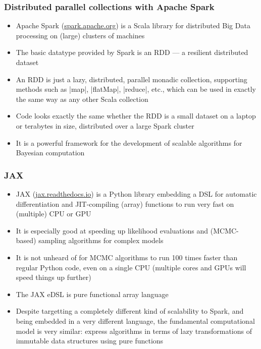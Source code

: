 \documentclass[mathserif,handout]{beamer}
\begin{document}
\begin{frame}[fragile]
  \frametitle{Distributed parallel collections with Apache Spark}
  \begin{itemize}
  \item \alert{Apache Spark} (\url{spark.apache.org}) is a Scala library for distributed Big Data processing on (large) clusters of machines
  \item The basic datatype provided by Spark is an \alert{RDD} --- a resilient distributed dataset
  \item An RDD is just a \alert{lazy}, \alert{distributed}, parallel monadic collection, supporting methods such as |map|, |flatMap|, |reduce|, etc., which can be used in exactly the same way as any other Scala collection
  \item Code looks exactly the same whether the RDD is a small dataset on a laptop or terabytes in size, distributed over a large Spark cluster
    \item It is a powerful framework for the development of scalable algorithms for Bayesian computation
  \end{itemize}
\end{frame}

\begin{frame}
  \frametitle{JAX}
  \begin{itemize}
  \item \alert{JAX} (\url{jax.readthedocs.io}) is a Python library embedding a DSL for automatic differentiation and JIT-compiling (array) functions to run very fast on (multiple) CPU or GPU
  \item It is especially good at speeding up likelihood evaluations and (MCMC-based) sampling algorithms for complex models
  \item It is not unheard of for MCMC algorithms to run 100 times faster than regular Python code, even on a single CPU (multiple cores and GPUs will speed things up further)
  \item The JAX eDSL is \alert{pure functional array language}
    \item Despite targetting a completely different kind of scalability to Spark, and being embedded in a very different language, the fundamental computational model is very similar: \alert{express algorithms in terms of lazy transformations of immutable data structures using pure functions}
  \end{itemize}  
\end{frame}
\end{document}
